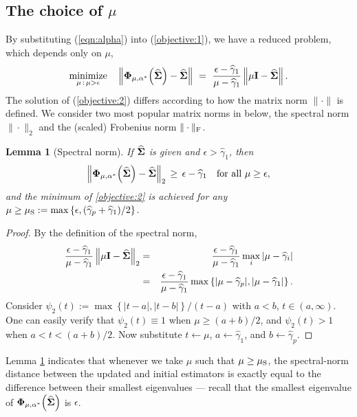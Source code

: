 \documentclass[times,sort&compress,3p]{elsarticle}
\newcommand{\NN}{\nonumber}
\newcommand{\minimize}{\mathop{\rm minimize}}
\newtheorem{lemma}{Lemma}
\begin{document}
\subsection{The choice of $\mu$}\label{subsec:mu}
By substituting (\ref{eqn:alpha}) into (\ref{objective:1}), we have a reduced problem, which depends only on $\mu$,
%
\begin{equation}\label{objective:2}
\minimize_{\mu \,:\, \mu > \epsilon} \quad
\left\| {\bf \Phi}_{\mu, \alpha^*}\Big(\widehat{\bf \Sigma}\Big)
	- \widehat{\bf \Sigma} \right\| ~ = ~
  	\frac{\epsilon - \widehat{\gamma}_{1}}{\mu - \widehat{\gamma}_{1}}
  	 \left\|   \mu {\bf I} - \widehat{\bf \Sigma}  \right\|.
\end{equation}
%
The solution of (\ref{objective:2}) differs according to how the matrix norm $\|\cdot\|$ is defined. We
consider two most popular matrix norms in below, the spectral norm $\|\cdot\|_2$ and the (scaled) Frobenius norm $\|\cdot\|_{\rm F}$.
%
\begin{lemma}[Spectral norm]\label{lemma:muspect} If $\widehat{\bf \Sigma}$ is given and $\epsilon > \widehat{\gamma}_{1}$, then
\[
\left\| {\bf \Phi}_{\mu, \alpha^*}\Big(\widehat{\bf \Sigma}\Big) 
	- \widehat{\bf \Sigma} \right\|_2
\,\geq\, \epsilon - \widehat{\gamma}_{1} ~~\mbox{ for all $\mu \geq \epsilon$},
\]
and the minimum of \eqref{objective:2} is achieved for any  $ \mu \geq 
	\mu_{\rm S} := \max \left\{ \epsilon, (\widehat{\gamma}_{p} + \widehat{\gamma}_{1})/2 \right\}$.
\end{lemma}
\begin{proof}%
By the definition of the spectral norm,
\begin{eqnarray}
\frac{\epsilon - \widehat{\gamma}_{1}}{\mu - \widehat{\gamma}_{1}} \left\|   \mu {\bf I} - \widehat{\bf \Sigma}  \right\|_2
&=&
\frac{\epsilon - \widehat{\gamma}_{1}}{\mu - \widehat{\gamma}_{1}} \max_{i} \left| \mu - \widehat{\gamma}_i \right|
\NN \\
&=&
\frac{\epsilon - \widehat{\gamma}_{1}}{\mu - \widehat{\gamma}_{1}} 
\max \left\{ | \mu - \widehat{\gamma}_{p} |, | \mu - \widehat{\gamma}_{1} | \right\}.
\NN
\end{eqnarray}
Consider $\psi_2(t) := \max \left\{ | t - a |, | t - b | \right\} / (t - a)$ with $a < b$, $t \in (a, \infty)$. One can easily verify that $\psi_2(t) \equiv 1$
 when $\mu \geq (a + b)/2$, and
$\psi_2(t) > 1$ when $a < t < (a + b)/2$. Now substitute $t \leftarrow \mu$, $a \leftarrow \widehat{\gamma}_{1}$, and $b \leftarrow \widehat{\gamma}_{p}$.
\end{proof}
\noindent Lemma \ref{lemma:muspect} indicates that whenever we take $\mu$ such that $\mu \geq \mu_{\rm S}$,  the spectral-norm distance  between the updated and initial estimators is exactly equal to the
 difference between their smallest eigenvalues --- recall that the smallest eigenvalue of ${\bf \Phi}_{\mu, \alpha^*}\Big(\widehat{\bf \Sigma}\Big)$ is $\epsilon$.
\end{document}
